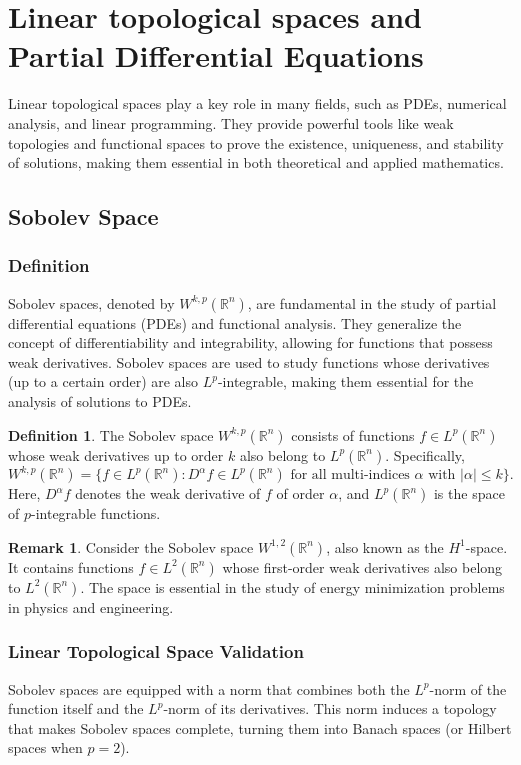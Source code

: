 \documentclass[12pt, reqno]{amsart}
\theoremstyle{definition}
\newtheorem{definition}[theorem]{Definition}
\newtheorem{remark}[theorem]{Remark}
\numberwithin{equation}{section}
\newcommand{\dR}{{\mathbb R}}
\begin{document}
\section{Linear topological spaces and Partial Differential Equations}
Linear topological spaces play a key role in many fields, such as PDEs, numerical analysis, and linear programming. They provide powerful tools like weak topologies and functional spaces to prove the existence, uniqueness, and stability of solutions, making them essential in both theoretical and applied mathematics.
\subsection{Sobolev Space}
\subsubsection{Definition}
Sobolev spaces, denoted by \( W^{k, p}(\dR^n) \), are fundamental in the study of partial differential equations (PDEs) and functional analysis. They generalize the concept of differentiability and integrability, allowing for functions that possess weak derivatives. Sobolev spaces are used to study functions whose derivatives (up to a certain order) are also \(L^p\)-integrable, making them essential for the analysis of solutions to PDEs.

\begin{definition}
The Sobolev space \(W^{k, p}(\dR^n)\) consists of functions \(f \in L^p(\dR^n)\) whose weak derivatives up to order \(k\) also belong to \(L^p(\dR^n)\). Specifically,
\[
W^{k, p}(\dR^n) = \{ f \in L^p(\dR^n) : D^\alpha f \in L^p(\dR^n) \text{ for all multi-indices } \alpha \text{ with } |\alpha| \leq k \}.
\]
Here, \(D^\alpha f\) denotes the weak derivative of \(f\) of order \(\alpha\), and \(L^p(\dR^n)\) is the space of \(p\)-integrable functions.
\end{definition}

\begin{remark}
Consider the Sobolev space \(W^{1, 2}(\dR^n)\), also known as the \(H^1\)-space. It contains functions \(f \in L^2(\dR^n)\) whose first-order weak derivatives also belong to \(L^2(\dR^n)\). The space is essential in the study of energy minimization problems in physics and engineering.
\end{remark}

\subsubsection{Linear Topological Space Validation}
Sobolev spaces are equipped with a norm that combines both the \(L^p\)-norm of the function itself and the \(L^p\)-norm of its derivatives. This norm induces a topology that makes Sobolev spaces complete, turning them into Banach spaces (or Hilbert spaces when \(p = 2\)).
\end{document}
